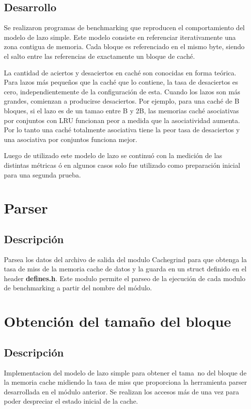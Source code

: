 \documentclass[a4paper,10pt]{article}
\begin{document}
\subsection{Desarrollo}
Se realizaron programas de benchmarking que reproducen el comportamiento del modelo de lazo simple.
Este modelo consiste en referenciar iterativamente una zona contigua de memoria. Cada bloque es referenciado en el mismo byte, siendo el salto entre las referencias de exactamente un bloque de caché.
\par
La cantidad de aciertos
y desaciertos en caché son conocidas en forma teórica. Para lazos más pequeños
que la caché que lo contiene, la tasa de desaciertos es cero, independientemente
de la configuración de esta. Cuando los lazos son más grandes, comienzan a
producirse desaciertos. Por ejemplo, para una caché de B bloques, si el lazo es
de un tamao entre B y 2B, las memorias caché asociativas por conjuntos con
LRU funcionan peor a medida que la asociatividad aumenta. Por lo tanto una
caché totalmente asociativa tiene la peor tasa de desaciertos y una asociativa
por conjuntos funciona mejor.
\par
Luego de utilizado este modelo de lazo se continuó con la medición de las distintas métricas ó en algunos casos solo fue utilizado como preparación inicial para una segunda prueba.

\newpage
\section{Parser}
\subsection{Descripción}
Parsea los datos del archivo de salida del modulo Cachegrind para que obtenga la tasa de miss de la memoria cache de datos y la guarda en un struct definido en el header \textbf{defines.h}. Este modulo permite el parseo de la ejecución de cada modulo de benchmarking a partir del nombre del módulo.



\section{Obtención del tamaño del bloque}
\subsection{Descripción}
Implementacion del modelo de lazo simple para obtener el tama~no del bloque de la memoria cache midiendo la tasa de miss que proporciona la herramienta parser desarrollada en el
módulo anterior. Se realizan los accesos más de una vez para poder despreciar el estado inicial de la cache.
\end{document}
